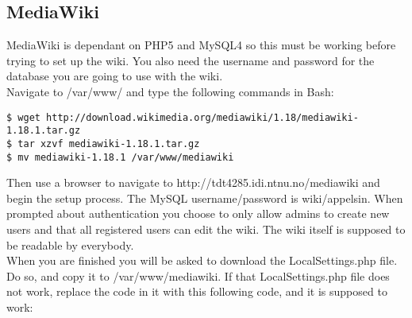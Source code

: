 \subsection {MediaWiki}
MediaWiki is dependant on PHP5 and MySQL4 so this must be working before trying to set up the wiki. You also need the username and password for the database you are going to use with the wiki.\\

Navigate to /var/www/ and type the following commands in Bash:
\begin{lstlisting}
$ wget http://download.wikimedia.org/mediawiki/1.18/mediawiki-1.18.1.tar.gz
$ tar xzvf mediawiki-1.18.1.tar.gz
$ mv mediawiki-1.18.1 /var/www/mediawiki
\end{lstlisting}

Then use a browser to navigate to http://tdt4285.idi.ntnu.no/mediawiki and begin the setup process. The MySQL username/password is wiki/appelsin. When prompted about authentication you choose to only allow admins to create new users and that all registered users can edit the wiki. The wiki itself is supposed to be readable by everybody. \\
When you are finished you will be asked to download the LocalSettings.php file. Do so, and copy it to /var/www/mediawiki. If that LocalSettings.php file does not work, replace the code in it with this following code, and it is supposed to work:
\lstset{language=PHP}

